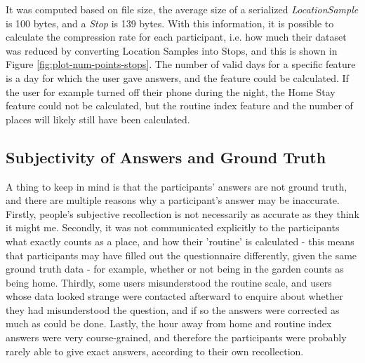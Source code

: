 It was computed based on file size, the average size of a serialized \textit{LocationSample} is 100 bytes, and a \textit{Stop} is 139 bytes. With this information, it is possible to calculate the compression rate for each participant, i.e. how much their dataset was reduced by converting Location Samples into Stops, and this is shown in Figure \ref{fig:plot-num-points-stops}. The number of valid days for a specific feature is a day for which the user gave answers, and the feature could be calculated. If the user for example turned off their phone during the night, the Home Stay feature could not be calculated, but the routine index feature and the number of places will likely still have been calculated.

\subsection{Subjectivity of Answers and Ground Truth}
A thing to keep in mind is that the participants' answers are not ground truth, and there are multiple reasons why a participant's answer may be inaccurate. Firstly, people's subjective recollection is not necessarily as accurate as they think it might me. Secondly, it was not communicated explicitly to the participants what exactly counts as a place, and how their 'routine' is calculated - this means that participants may have filled out the questionnaire differently, given the same ground truth data - for example, whether or not being in the garden counts as being home. Thirdly, some users misunderstood the routine scale, and users whose data looked strange were contacted afterward to enquire about whether they had misunderstood the question, and if so the answers were corrected as much as could be done. Lastly, the hour away from home and routine index answers were very course-grained, and therefore the participants were probably rarely able to give exact answers, according to their own recollection. 

